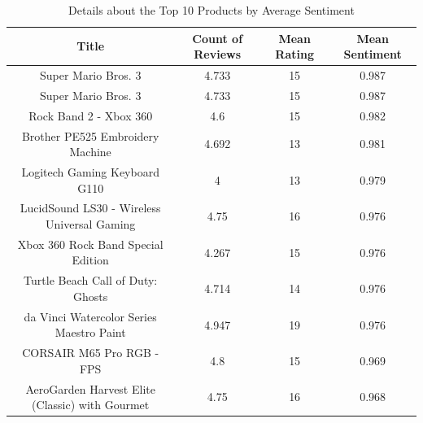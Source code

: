 \begin{table}[h]
  \centering
  \begin{tabular}{cccc}
      \hline
      \textbf{Title} & \textbf{Count of Reviews} & \textbf{Mean Rating} & \textbf{Mean Sentiment} \\
      \hline
      Super Mario Bros. 3                             &         4.733 &      15 &        0.987 \\
      Super Mario Bros. 3                             &         4.733 &      15 &        0.987 \\
      Rock Band 2 - Xbox 360                          &         4.6   &      15 &        0.982 \\
      Brother PE525 Embroidery Machine                &         4.692 &      13 &        0.981 \\
      Logitech Gaming Keyboard G110                   &         4     &      13 &        0.979 \\
      LucidSound LS30 - Wireless Universal Gaming     &         4.75  &      16 &        0.976 \\
      Xbox 360 Rock Band Special Edition              &         4.267 &      15 &        0.976 \\
      Turtle Beach Call of Duty: Ghosts               &         4.714 &      14 &        0.976 \\
      da Vinci Watercolor Series Maestro Paint        &         4.947 &      19 &        0.976 \\
      CORSAIR M65 Pro RGB - FPS                       &         4.8   &      15 &        0.969 \\
      AeroGarden Harvest Elite (Classic) with Gourmet &         4.75  &      16 &        0.968 \\
           \hline
  \end{tabular}
  \caption{Details about the Top 10 Products by Average Sentiment}
  \label{tab:top 10 products statistics}
\end{table}


